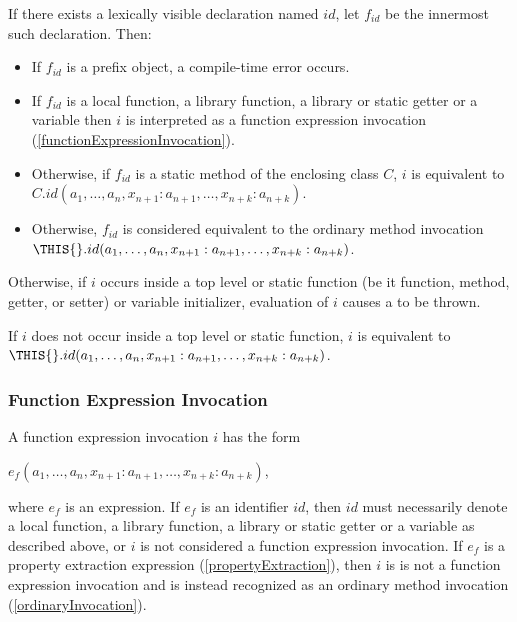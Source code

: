 \documentclass{article}
\begin{document}
\LMHash{}
If there exists a lexically visible declaration named $id$, let $f_{id}$ be the innermost such declaration. Then:
\begin{itemize}
\item
If $f_{id}$ is a prefix object, a compile-time error occurs.
\item
 If $f_{id}$ is a local function, a library function, a library or static getter or a variable then $i$ is interpreted as a function expression invocation (\ref{functionExpressionInvocation}).
 \item
Otherwise, if $f_{id}$ is a static method of the enclosing class $C$, $i$ is equivalent to $C.id(a_1, \ldots , a_n, x_{n+1}: a_{n+1}, \ldots , x_{n+k}: a_{n+k})$.
\item Otherwise, $f_{id}$ is considered equivalent to the ordinary method invocation $\THIS{}.id(a_1, \ldots , a_n, x_{n+1}: a_{n+1}, \ldots , x_{n+k}: a_{n+k})$.
\end{itemize}

\LMHash{}
Otherwise, if $i$ occurs inside a top level or static function (be it function, method, getter,  or setter) or variable initializer, evaluation of $i$ causes a  to be thrown.

\LMHash{}
If $i$ does not occur inside a top level or static function, $i$ is equivalent to $\THIS{}.id(a_1, \ldots , a_n, x_{n+1}: a_{n+1}, \ldots , x_{n+k}: a_{n+k})$.







\subsubsection{ Function Expression Invocation}

\LMHash{}
A function expression invocation $i$ has the form

$e_f(a_1, \ldots , a_n, x_{n+1}: a_{n+1}, \ldots , x_{n+k}: a_{n+k})$,

where $e_f$ is an expression. If $e_f$ is an identifier $id$, then $id$ must necessarily denote a local function, a library function, a library or static getter or a variable as described above, or $i$ is not considered a function expression invocation. If $e_f$ is a property extraction expression (\ref{propertyExtraction}), then $i$ is is not a function expression invocation and is instead recognized as an ordinary method invocation (\ref{ordinaryInvocation}).
\end{document}
